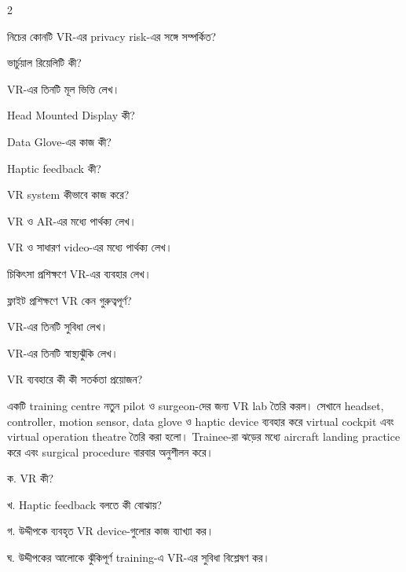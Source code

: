 \begin{topicbody}
\begin{multicols}{2}
\begin{compactenum}
\item \begin{minipage}[t]{\linewidth}নিচের কোনটি VR-এর privacy risk-এর সঙ্গে সম্পর্কিত?\par {}\par\end{minipage}
\end{compactenum}\end{multicols}

\begin{compactenum}
\item ভার্চুয়াল রিয়েলিটি কী?
\item VR-এর তিনটি মূল ভিত্তি লেখ।
\item Head Mounted Display কী?
\item Data Glove-এর কাজ কী?
\item Haptic feedback কী?
\item VR system কীভাবে কাজ করে?
\item VR ও AR-এর মধ্যে পার্থক্য লেখ।
\item VR ও সাধারণ video-এর মধ্যে পার্থক্য লেখ।
\item চিকিৎসা প্রশিক্ষণে VR-এর ব্যবহার লেখ।
\item ফ্লাইট প্রশিক্ষণে VR কেন গুরুত্বপূর্ণ?
\item VR-এর তিনটি সুবিধা লেখ।
\item VR-এর তিনটি স্বাস্থ্যঝুঁকি লেখ।
\item VR ব্যবহারে কী কী সতর্কতা প্রয়োজন?
\end{compactenum}

একটি training centre নতুন pilot ও surgeon-দের জন্য VR lab তৈরি করল। সেখানে headset, controller, motion sensor, data glove ও haptic device ব্যবহার করে virtual cockpit এবং virtual operation theatre তৈরি করা হলো। Trainee-রা ঝড়ের মধ্যে aircraft landing practice করে এবং surgical procedure বারবার অনুশীলন করে।

\begin{compactenum}
\item ক. VR কী?
\item খ. Haptic feedback বলতে কী বোঝায়?
\item গ. উদ্দীপকে ব্যবহৃত VR device-গুলোর কাজ ব্যাখ্যা কর।
\item ঘ. উদ্দীপকের আলোকে ঝুঁকিপূর্ণ training-এ VR-এর সুবিধা বিশ্লেষণ কর।
\end{compactenum}


\end{topicbody}
